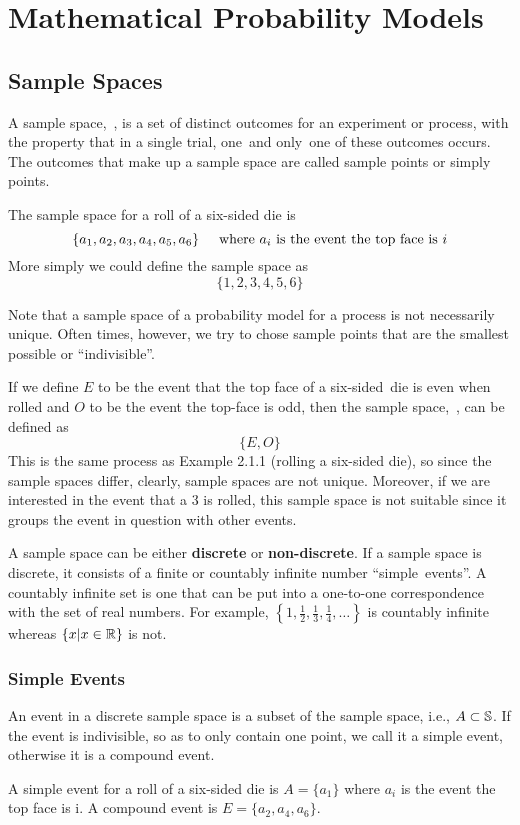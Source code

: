 \chapter{Mathematical Probability Models}
\section{Sample Spaces}
A sample space,~\sS, is a set of distinct outcomes for an experiment or process, with the property that in a single trial, one~and only~one of these outcomes occurs. The outcomes that make up a sample space are called sample points or simply points.
\begin{example}
The sample space for a roll of a six-sided die is
\[
    \{a_1,a_2,a_3,a_4,a_5,a_6\}\hspace{5mm}\text{where $a_i$ is the event the top face is $i$}
\]
More simply we could define the sample space as
\[
    \{1,2,3,4,5,6\}
\]
\end{example}
\begin{info}
Note that a sample space of a probability model for a process is not necessarily unique. Often times, however, we try to chose sample points that are the smallest possible or ``indivisible''.
\end{info}
\begin{example}
If we define $E$ to be the event that the top face of a six-sided~die is even when rolled and $O$ to be the event the top-face is odd, then the sample space,~\sS, can be defined as
\[
    \{E,O\}
\]
This is the same process as Example 2.1.1 (rolling a six-sided die), so since the sample spaces differ, clearly, sample spaces are not unique. Moreover, if we are interested in the event that a 3 is rolled, this sample space is not suitable since it groups the event in question with other events.
\end{example}
A sample space can be either \textbf{discrete} or \textbf{non-discrete}. If a sample space is discrete, it consists of a finite or countably infinite number ``simple~events''. A countably infinite set is one that can be put into a one-to-one correspondence with the set of real numbers. For example, $\left\{1,\frac{1}{2},\frac{1}{3},\frac{1}{4},\ldots\right\}$ is countably infinite whereas $\{x|x\in\mathbb{R}\}$ is not.
\subsection*{Simple Events}
An event in a discrete sample space is a subset of the sample space, i.e., $A \subset \mathbb{S}$. If the event is indivisible, so as to only contain one point, we call it a simple event, otherwise it is a compound event.
\begin{example}
A simple event for a roll of a six-sided die is $A = \{a_1\}$ where $a_i$ is the event the top face is i. A compound event is $E = \{a_2,a_4,a_6\}$.
\end{example}

